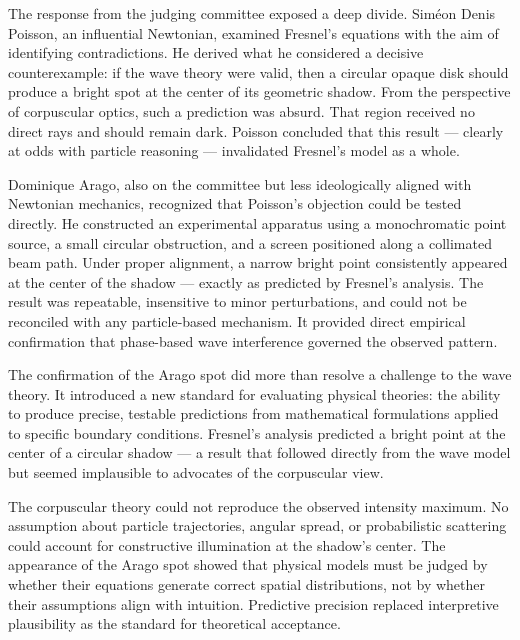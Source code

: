The response from the judging committee exposed a deep divide. Siméon Denis Poisson, an influential Newtonian, examined Fresnel’s equations with the aim of identifying contradictions. He derived what he considered a decisive counterexample: if the wave theory were valid, then a circular opaque disk should produce a bright spot at the center of its geometric shadow. From the perspective of corpuscular optics, such a prediction was absurd. That region received no direct rays and should remain dark. Poisson concluded that this result — clearly at odds with particle reasoning — invalidated Fresnel’s model as a whole.

Dominique Arago, also on the committee but less ideologically aligned with Newtonian mechanics, recognized that Poisson’s objection could be tested directly. He constructed an experimental apparatus using a monochromatic point source, a small circular obstruction, and a screen positioned along a collimated beam path. Under proper alignment, a narrow bright point consistently appeared at the center of the shadow — exactly as predicted by Fresnel’s analysis. The result was repeatable, insensitive to minor perturbations, and could not be reconciled with any particle-based mechanism. It provided direct empirical confirmation that phase-based wave interference governed the observed pattern.

The confirmation of the Arago spot did more than resolve a challenge to the wave theory. It introduced a new standard for evaluating physical theories: the ability to produce precise, testable predictions from mathematical formulations applied to specific boundary conditions. Fresnel’s analysis predicted a bright point at the center of a circular shadow — a result that followed directly from the wave model but seemed implausible to advocates of the corpuscular view.

The corpuscular theory could not reproduce the observed intensity maximum. No assumption about particle trajectories, angular spread, or probabilistic scattering could account for constructive illumination at the shadow’s center. The appearance of the Arago spot showed that physical models must be judged by whether their equations generate correct spatial distributions, not by whether their assumptions align with intuition. Predictive precision replaced interpretive plausibility as the standard for theoretical acceptance.

